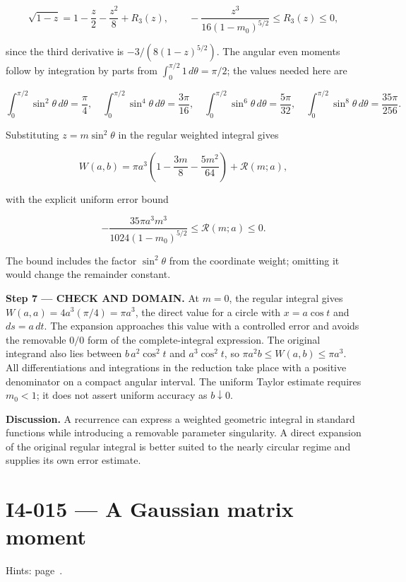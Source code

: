 \documentclass[11pt,oneside,openany]{book}
\begin{document}
\[
\sqrt{1-z}=1-\frac z2-\frac{z^2}{8}+R_3(z),
\qquad
-\frac{z^3}{16(1-m_0)^{5/2}}\le R_3(z)\le0,
\]

since the third derivative is \(-3/(8(1-z)^{5/2})\). The angular even moments follow by integration by parts from \(\int_0^{\pi/2}1\,d\theta=\pi/2\); the values needed here are

\[
\int_0^{\pi/2}\sin^2\theta\,d\theta=\frac\pi4,\quad
\int_0^{\pi/2}\sin^4\theta\,d\theta=\frac{3\pi}{16},\quad
\int_0^{\pi/2}\sin^6\theta\,d\theta=\frac{5\pi}{32},\quad
\int_0^{\pi/2}\sin^8\theta\,d\theta=\frac{35\pi}{256}.
\]

Substituting \(z=m\sin^2\theta\) in the regular weighted integral gives

\[
W(a,b)=\pi a^3\left(1-\frac{3m}{8}-\frac{5m^2}{64}\right)+\mathcal R(m;a),
\]

with the explicit uniform error bound

\[
-\frac{35\pi a^3m^3}{1024(1-m_0)^{5/2}}
\le\mathcal R(m;a)\le0.
\]

The bound includes the factor \(\sin^2\theta\) from the coordinate weight; omitting it would change the remainder constant.

\endgroup
\begin{DomainStep}
\textbf{Step 7 --- CHECK AND DOMAIN.} At \(m=0\), the regular integral gives \(W(a,a)=4a^3(\pi/4)=\pi a^3\), the direct value for a circle with \(x=a\cos t\) and \(ds=a\,dt\). The expansion approaches this value with a controlled error and avoids the removable \(0/0\) form of the complete-integral expression. The original integrand also lies between \(b\,a^2\cos^2t\) and \(a^3\cos^2t\), so \(\pi a^2b\le W(a,b)\le\pi a^3\). All differentiations and integrations in the reduction take place with a positive denominator on a compact angular interval. The uniform Taylor estimate requires \(m_0<1\); it does not assert uniform accuracy as \(b\downarrow0\).

\end{DomainStep}
\textbf{Discussion.} A recurrence can express a weighted geometric integral in standard functions while introducing a removable parameter singularity. A direct expansion of the original regular integral is better suited to the nearly circular regime and supplies its own error estimate.
\clearpage
\section{I4-015 --- A Gaussian matrix moment}
\label{problem:I4-015}
{\small Hints: page~\pageref{hints:I4-015}.}\par\medskip
\end{document}

